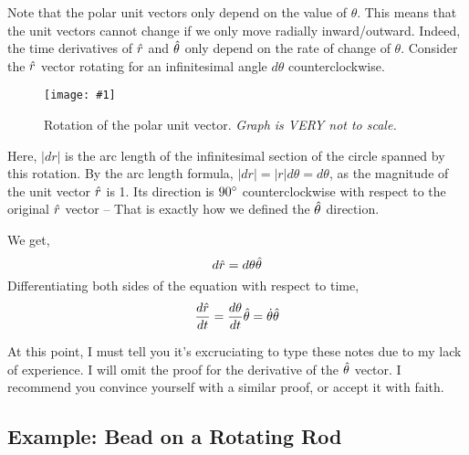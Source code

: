 \documentclass[11pt]{article}
\newcommand{\fig}[4]{
    \begin{figure}[H]
        \centering
        \texttt{[image: \#1]}
        \caption{#2}
        \label{exp4fit}
    \end{figure}
}
\theoremstyle{gangnamstyle}{\newtheorem{definition}{Definition}[]}
\theoremstyle{gangnamstyle}{\newtheorem{example}{Example}[]}
\theoremstyle{gangnamstyle}{\newtheorem{problem}{Problem}[]}
\begin{document}
Note that the polar unit vectors only depend on the value of $\theta$. This means that the unit vectors cannot change if we only move radially inward/outward. Indeed, the time derivatives of $\Hat{r}$ and $\Hat{\theta}$ only depend on the rate of change of $\theta$. Consider the $\Hat{r}$ vector rotating for an infinitesimal angle $d\theta$ counterclockwise. 

\fig{figs/n0/rotate.jpg}{Rotation of the polar unit vector. \textit{Graph is VERY not to scale.}}{0.12}{0}

Here, $|dr|$ is the arc length of the infinitesimal section of the circle spanned by this rotation. By the arc length formula, $|dr| = |r| d\theta = d\theta$, as the magnitude of the unit vector $\Hat{r}$ is 1. Its direction is $90\degree$ counterclockwise with respect to the original $\Hat{r}$ vector -- That is exactly how we defined the $\Hat{\theta}$ direction. 

We get, 
\[ d\Hat{r} = d\theta\Hat{\theta} \]
Differentiating both sides of the equation with respect to time, 
\[ \frac{d\Hat{r}}{dt} = \frac{d\theta}{dt}\Hat{\theta} = \Dot{\theta}\Hat{\theta} \]

At this point, I must tell you it's excruciating to type these notes due to my lack of experience. I will omit the proof for the derivative of the $\Hat{\theta}$ vector. I recommend you convince yourself with a similar proof, or accept it with faith. 

\subsection{Example: Bead on a Rotating Rod}
\end{document}
